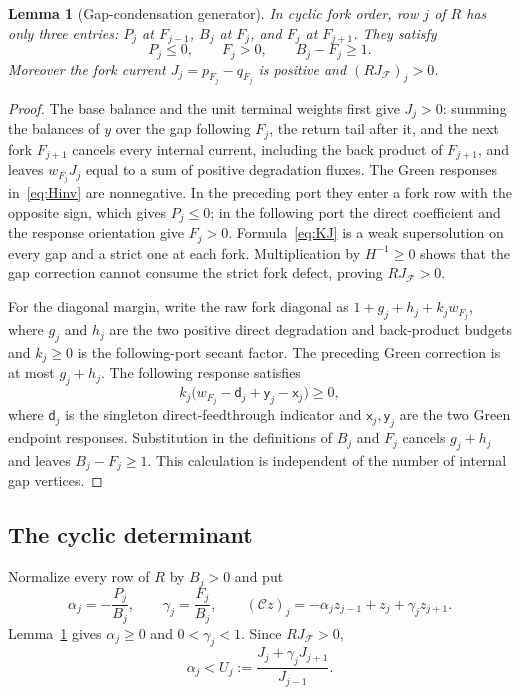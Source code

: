 \documentclass[11pt,reqno]{amsart}
\theoremstyle{plain}
\newtheorem{lemma}[theorem]{Lemma}
\theoremstyle{definition}
\theoremstyle{remark}
\numberwithin{equation}{section}
\begin{document}
\begin{lemma}[Gap-condensation generator]\label{lem:generator}
In cyclic fork order, row $j$ of $R$ has only three entries: $P_j$ at $F_{j-1}$, $B_j$ at $F_j$, and $F_j$ at $F_{j+1}$.  They satisfy
\[
P_j\le0,\qquad F_j>0,\qquad B_j-F_j\ge1 .
\]
Moreover the fork current $J_j=p_{F_j}-q_{F_j}$ is positive and $(RJ_{\mathcal F})_j>0$.
\end{lemma}

\begin{proof}
The base balance and the unit terminal weights first give $J_j>0$: summing the balances of $y$ over the gap following $F_j$, the return tail after it, and the next fork $F_{j+1}$ cancels every internal current, including the back product of $F_{j+1}$, and leaves $w_{F_j}J_j$ equal to a sum of positive degradation fluxes.  The Green responses in~\eqref{eq:Hinv} are nonnegative.  In the preceding port they enter a fork row with the opposite sign, which gives $P_j\le0$; in the following port the direct coefficient and the response orientation give $F_j>0$.  Formula~\eqref{eq:KJ} is a weak supersolution on every gap and a strict one at each fork.  Multiplication by $H^{-1}\ge0$ shows that the gap correction cannot consume the strict fork defect, proving $RJ_{\mathcal F}>0$.

For the diagonal margin, write the raw fork diagonal as $1+g_j+h_j+k_jw_{F_j}$, where $g_j$ and $h_j$ are the two positive direct degradation and back-product budgets and $k_j\ge0$ is the following-port secant factor.  The preceding Green correction is at most $g_j+h_j$.  The following response satisfies
\begin{equation}\label{eq:margin}
k_j\bigl(w_{F_j}-\mathsf d_j+\mathsf y_j-\mathsf x_j\bigr)\ge0,
\end{equation}
where $\mathsf d_j$ is the singleton direct-feedthrough indicator and $\mathsf x_j,\mathsf y_j$ are the two Green endpoint responses.  Substitution in the definitions of $B_j$ and $F_j$ cancels $g_j+h_j$ and leaves $B_j-F_j\ge1$.  This calculation is independent of the number of internal gap vertices.
\end{proof}

\subsection{The cyclic determinant}\label{subsec:cyclic}
Normalize every row of $R$ by $B_j>0$ and put
\begin{equation}\label{eq:normalized}
\alpha_j=-\frac{P_j}{B_j},\qquad \gamma_j=\frac{F_j}{B_j},\qquad
(\mathcal Cz)_j=-\alpha_jz_{j-1}+z_j+\gamma_jz_{j+1} .
\end{equation}
Lemma~\ref{lem:generator} gives $\alpha_j\ge0$ and $0<\gamma_j<1$.  Since $RJ_{\mathcal F}>0$,
\begin{equation}\label{eq:U}
\alpha_j<U_j:=\frac{J_j+\gamma_jJ_{j+1}}{J_{j-1}} .
\end{equation}
\end{document}
